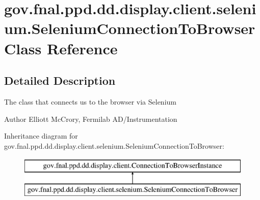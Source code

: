 \hypertarget{classgov_1_1fnal_1_1ppd_1_1dd_1_1display_1_1client_1_1selenium_1_1SeleniumConnectionToBrowser}{\section{gov.\-fnal.\-ppd.\-dd.\-display.\-client.\-selenium.\-Selenium\-Connection\-To\-Browser Class Reference}
\label{classgov_1_1fnal_1_1ppd_1_1dd_1_1display_1_1client_1_1selenium_1_1SeleniumConnectionToBrowser}
}


\subsection{Detailed Description}
The class that connects us to the browser via Selenium

\begin{DoxyAuthor}{Author}
Elliott Mc\-Crory, Fermilab A\-D/\-Instrumentation 
\end{DoxyAuthor}
Inheritance diagram for gov.\-fnal.\-ppd.\-dd.\-display.\-client.\-selenium.\-Selenium\-Connection\-To\-Browser\-:\begin{figure}[H]
\begin{center}
\leavevmode
\includegraphics[height=2.000000cm]{classgov_1_1fnal_1_1ppd_1_1dd_1_1display_1_1client_1_1selenium_1_1SeleniumConnectionToBrowser}
\end{center}
\end{figure}
